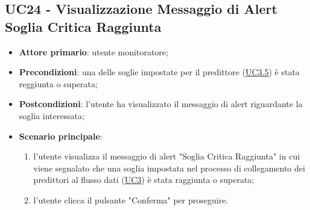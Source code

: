 
\label{par:UC24}
	\subsection{UC24 - Visualizzazione Messaggio di Alert Soglia Critica Raggiunta}
		\begin{itemize}
			\item\textbf{Attore primario}: utente monitoratore;
			\item\textbf{Precondizioni}: una delle soglie impostate per il predittore (\hyperref[par:UC3.5]{UC3.5}) è stata reggiunta o superata;
			\item\textbf{Postcondizioni}: l’utente ha visualizzato il messaggio di alert riguardante la soglia interessata;
			\item\textbf{Scenario principale}: 
				\begin{enumerate} 
					\item l’utente visualizza il messaggio di alert "Soglia Critica Raggiunta" in cui viene segnalato che una soglia impostata nel processo di collegamento dei predittori al flusso dati (\hyperref[par:UC3]{UC3}) è stata raggiunta o superata;
					\item l'utente clicca il pulsante "Conferma" per proseguire.		
				\end{enumerate}		
		\end{itemize}
	




